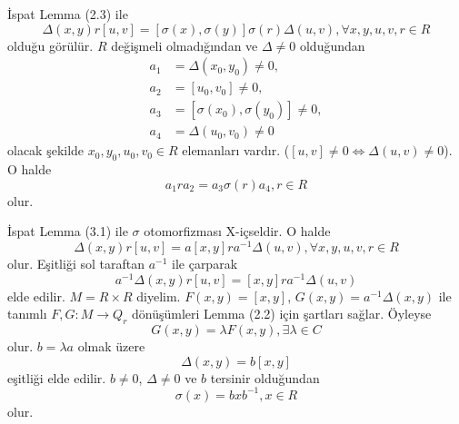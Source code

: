 \documentclass{beamer}
\begin{document}
\begin{frame}
\footnotesize

\begin{block}{İspat}
Lemma (2.3) ile
\begin{equation*}
    \Delta(x,y)r[u,v] = [\sigma(x),\sigma(y)]\sigma(r)\Delta(u,v), \forall x, y, u, v, r \in R
\end{equation*}
olduğu görülür. $R$ değişmeli olmadığından ve $\Delta \neq 0$ olduğundan
\begin{align*}
    a_1 &= \Delta(x_0,y_0) \neq 0,\\
    a_2 &= [u_0, v_0] \neq 0,\\
    a_3 &= [\sigma(x_0),\sigma(y_0)] \neq 0,\\
    a_4 &= \Delta(u_0,v_0) \neq 0
\end{align*}
olacak şekilde $x_0, y_0, u_0, v_0 \in R$ elemanları vardır. ($[u,v] \neq 0 \iff \Delta(u,v) \neq 0$).\\
O halde
\begin{equation*}
    a_1ra_2 = a_3\sigma(r)a_4, r \in R
\end{equation*}
olur.
\end{block}
    
\end{frame}

\begin{frame}
\footnotesize

\begin{block}{İspat}
Lemma (3.1) ile $\sigma$ otomorfizması X-içseldir. O halde
\begin{equation*}
    \Delta(x,y)r[u,v] = a[x,y]ra^{-1}\Delta(u,v), \forall x, y, u, v, r \in R
\end{equation*}
olur. Eşitliği sol taraftan $a^{-1}$ ile çarparak
\begin{equation*}
    a^{-1}\Delta(x,y)r[u,v] = [x,y]ra^{-1}\Delta(u,v)
\end{equation*}
elde edilir. $M = R \times R$ diyelim. $F(x,y) = [x,y]$, $G(x,y) = a^{-1}\Delta(x,y)$ ile tanımlı $F, G \colon M \to Q_r$ dönüşümleri Lemma (2.2) için şartları sağlar. Öyleyse
\begin{equation*}
    G(x,y) = \lambda F(x,y), \exists \lambda \in C
\end{equation*}
olur. $b = \lambda a$ olmak üzere
\begin{equation*}
    \Delta(x,y) = b[x,y]
\end{equation*}
eşitliği elde edilir. $b \neq 0$, $\Delta \neq 0$ ve $b$ tersinir olduğundan
\begin{equation*}
    \sigma(x) = bxb^{-1}, x \in R
\end{equation*}
olur.
\end{block}
    
\end{frame}
\end{document}
